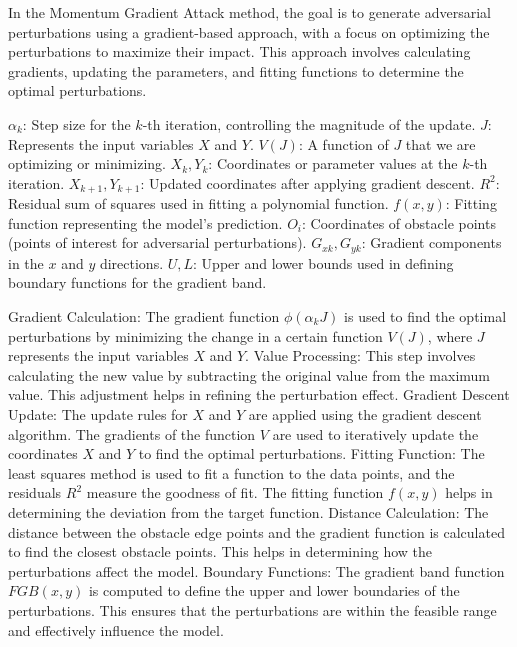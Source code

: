 
In the Momentum Gradient Attack method, the goal is to generate adversarial perturbations using a gradient-based approach, with a focus on optimizing the perturbations to maximize their impact. This approach involves calculating gradients, updating the parameters, and fitting functions to determine the optimal perturbations.

$\alpha_k$: Step size for the $k$-th iteration, controlling the magnitude of the update.
$J$: Represents the input variables $X$ and $Y$.
$V(J)$: A function of $J$ that we are optimizing or minimizing.
$X_k, Y_k$: Coordinates or parameter values at the $k$-th iteration.
$X_{k+1}, Y_{k+1}$: Updated coordinates after applying gradient descent.
$R^2$: Residual sum of squares used in fitting a polynomial function.
$f(x, y)$: Fitting function representing the model's prediction.
$O_i$: Coordinates of obstacle points (points of interest for adversarial perturbations).
$G_{xk}, G_{yk}$: Gradient components in the $x$ and $y$ directions.
$U, L$: Upper and lower bounds used in defining boundary functions for the gradient band.

Gradient Calculation: The gradient function $\phi(\alpha_k J)$ is used to find the optimal perturbations by minimizing the change in a certain function $V(J)$, where $J$ represents the input variables $X$ and $Y$.
Value Processing: This step involves calculating the new value by subtracting the original value from the maximum value. This adjustment helps in refining the perturbation effect.
Gradient Descent Update: The update rules for $X$ and $Y$ are applied using the gradient descent algorithm. The gradients of the function $V$ are used to iteratively update the coordinates $X$ and $Y$ to find the optimal perturbations.
Fitting Function: The least squares method is used to fit a function to the data points, and the residuals $R^2$ measure the goodness of fit. The fitting function $f(x, y)$ helps in determining the deviation from the target function.
Distance Calculation: The distance between the obstacle edge points and the gradient function is calculated to find the closest obstacle points. This helps in determining how the perturbations affect the model.
Boundary Functions: The gradient band function $ FGB(x, y)$ is computed to define the upper and lower boundaries of the perturbations. This ensures that the perturbations are within the feasible range and effectively influence the model.


